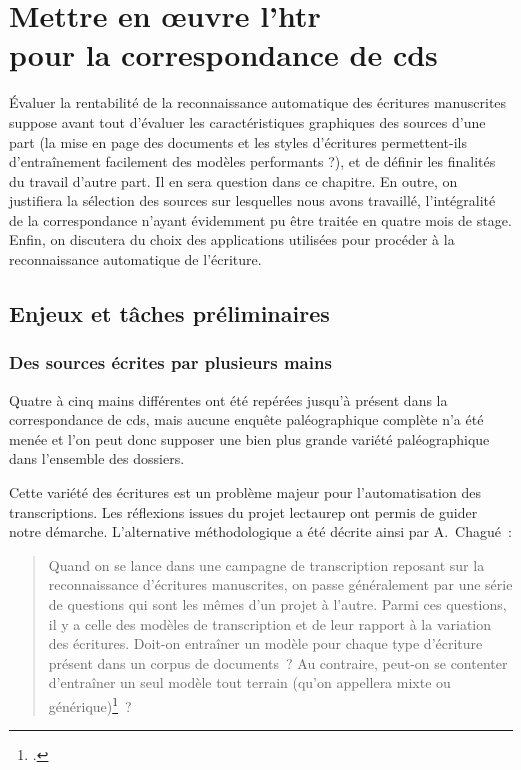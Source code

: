 \documentclass[a4paper,12pt,twoside]{book}
\begin{document}
	\chapter[HTR~: mise en œuvre]{Mettre en œuvre l'\gls{htr} \\ \large pour la correspondance de \gls{cds}}
		
		Évaluer la rentabilité de la reconnaissance automatique des écritures manuscrites suppose avant tout d'évaluer les caractéristiques graphiques des sources d'une part (la mise en page des documents et les styles d'écritures permettent-ils d'entraînement facilement des modèles performants ?), et de définir les finalités du travail d'autre part. Il en sera question dans ce chapitre. En outre, on justifiera la sélection des sources sur lesquelles nous avons travaillé, l'intégralité de la correspondance n'ayant évidemment pu être traitée en quatre mois de stage. Enfin, on discutera du choix des applications utilisées pour procéder à la reconnaissance automatique de l'écriture.
	
		\section{Enjeux et tâches préliminaires}
			
			\subsection{Des sources écrites par plusieurs mains}
				Quatre à cinq mains différentes ont été repérées jusqu'à présent dans la correspondance de \gls{cds}, mais aucune enquête paléographique complète n'a été menée et l'on peut donc supposer une bien plus grande variété paléographique dans l'ensemble des dossiers.
				
				Cette variété des écritures est un problème majeur pour l'automatisation des transcriptions. Les réflexions issues du projet \gls{lectaurep} ont permis de guider notre démarche. L'alternative méthodologique a été décrite ainsi par A.~Chagué~:
				
				\begin{quotation}
					Quand on se lance dans une campagne de transcription reposant sur la reconnaissance d’écritures manuscrites, on passe généralement par une série de questions qui sont les mêmes d’un projet à l’autre. Parmi ces questions, il y a celle des modèles de transcription et de leur rapport à la variation des écritures. Doit-on entraîner un modèle pour chaque type d’écriture présent dans un corpus de documents~? Au contraire, peut-on se contenter d’entraîner un seul modèle tout terrain (qu’on appellera mixte ou générique)\footcite{chagueCreationModelesTranscription}~?
				\end{quotation}
			
\end{document}
